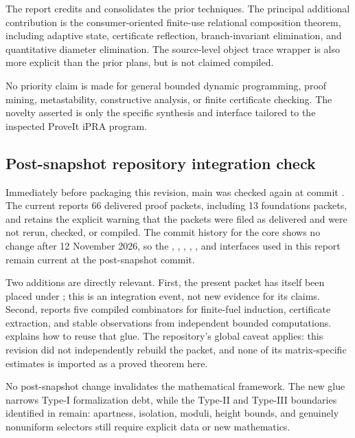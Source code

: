 The report credits and consolidates the prior techniques.  The principal additional contribution is the consumer-oriented finite-use relational composition theorem, including adaptive state, certificate reflection, branch-invariant elimination, and quantitative diameter elimination.  The source-level object trace wrapper is also more explicit than the prior plans, but is not claimed compiled.

No priority claim is made for general bounded dynamic programming, proof mining, metastability, constructive analysis, or finite certificate checking.  The novelty asserted is only the specific synthesis and interface tailored to the inspected ProveIt iPRA program.


\subsection{Post-snapshot repository integration check}

Immediately before packaging this revision, main was checked again at commit
.  The current
 reports 66 delivered proof
packets, including 13 foundations packets, and retains the explicit warning
that the packets were filed as delivered and were not rerun, checked, or
compiled.  The commit history for the core 
shows no change after 12 November 2026, so the , ,
, , , and
 interfaces used in this report remain current at the
post-snapshot commit.

Two additions are directly relevant.  First, the present packet has itself
been placed under
; this is an
integration event, not new evidence for its claims.  Second,
reports five compiled  combinators for finite-fuel induction,
certificate extraction, and stable observations from independent bounded
computations.   explains how to reuse that glue.
The repository's global caveat applies: this revision did not independently
rebuild the packet, and none of its matrix-specific estimates is imported as a
proved theorem here.

No post-snapshot change invalidates the mathematical framework.  The new glue
narrows Type-I formalization debt, while the Type-II and Type-III boundaries
identified in  remain: apartness, isolation, moduli, height
bounds, and genuinely nonuniform selectors still require explicit data or new
mathematics.
